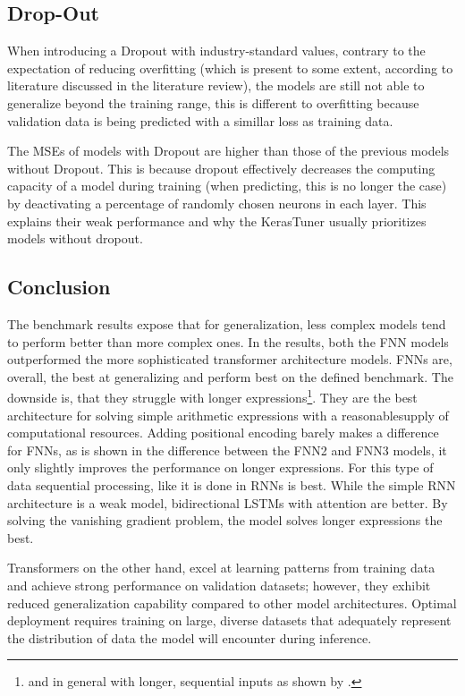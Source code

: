 \documentclass{article}
\begin{document}
\subsection{Drop-Out}
When introducing a Dropout with industry-standard values, contrary to the expectation of reducing overfitting (which is present to some extent, according to literature discussed in the literature review), the models are still not able to generalize beyond the training range, this is different to overfitting because validation data is being predicted with a simillar loss as training data.

The MSEs of models with Dropout are higher than those of the previous models without Dropout. This is because dropout effectively decreases the computing capacity of a model during training (when predicting, this is no longer the case) by deactivating a percentage of randomly chosen neurons in each layer. This explains their weak performance and why the KerasTuner usually prioritizes models without dropout.


\subsection{Conclusion}
The benchmark results expose that for generalization, less complex models tend to perform better than more complex ones.
In the results, both the FNN models outperformed the more sophisticated transformer architecture models.
FNNs are, overall, the best at generalizing and perform best on the defined benchmark. The downside is, that they struggle with longer expressions\footnote{and in general with longer, sequential inputs as shown by \cite{Goodfellow-et-al-2016}.}. They are the best architecture for solving simple arithmetic expressions with a reasonable\footnotemark supply of computational resources. 
Adding positional encoding barely makes a difference for FNNs, as is shown in the difference between the FNN2 and FNN3 models, it only slightly improves the performance on longer expressions. 
For this type of data sequential processing, like it is done in RNNs is best. While the simple RNN architecture is a weak model, bidirectional LSTMs with attention are better. By solving the vanishing gradient problem, the model solves longer expressions the best.

Transformers on the other hand, excel at learning patterns from training data and achieve strong performance on validation datasets; however, they exhibit reduced generalization capability compared to other model architectures. Optimal deployment requires training on large, diverse datasets that adequately represent the distribution of data the model will encounter during inference. 
\end{document}
